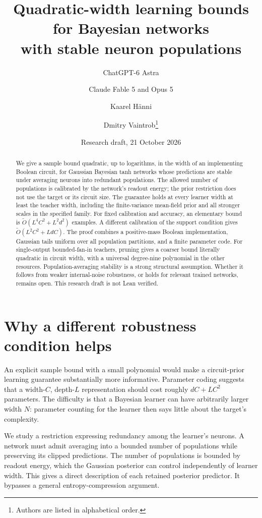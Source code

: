 \documentclass[11pt]{article}
\title{Quadratic-width learning bounds for Bayesian networks\protect\\with stable neuron populations}
\author{ChatGPT-6 Astra \and Claude Fable 5 and Opus 5 \and Kaarel H\"anni \and Dmitry Vaintrob\thanks{Authors are listed in alphabetical order.}}
\date{Research draft, 21 October 2026}
\begin{document}
\maketitle
\begin{abstract}
We give a sample bound quadratic, up to logarithms, in the width of an
implementing Boolean circuit, for Gaussian Bayesian tanh networks whose
predictions are stable under averaging neurons into redundant populations.
The allowed number of populations is calibrated by the network's readout
energy; the prior restriction does not use the target or its circuit size.
The guarantee holds at every learner width at least the teacher width,
including the finite-variance mean-field prior and all stronger scales in
the specified family. For fixed calibration and accuracy, an elementary
bound is $\widetilde O(L^4C^2+L^2d^2)$ examples. A different calibration of
the support condition gives $\widetilde O(L^2C^2+LdC)$.
The proof combines a positive-mass Boolean implementation, Gaussian tails
uniform over all population partitions, and a finite parameter code.
For single-output bounded-fan-in teachers, pruning gives a coarser bound
literally quadratic in circuit width, with a universal degree-nine
polynomial in the other resources.
Population-averaging stability is a strong structural assumption. Whether
it follows from weaker internal-noise robustness, or holds for relevant
trained networks, remains open. This research draft is not Lean verified.
\end{abstract}

\section{Why a different robustness condition helps}

An explicit sample bound with a small polynomial would make a circuit-prior
learning guarantee substantially more informative. Parameter coding suggests
that a width-$C$, depth-$L$ representation should cost roughly
$dC+LC^2$ parameters. The difficulty is that a Bayesian learner can have
arbitrarily larger width $N$: parameter counting for the learner then says
little about the target's complexity.

We study a restriction expressing redundancy among the learner's neurons.
A network must admit averaging into a bounded number of populations while
preserving its clipped predictions. The number of populations is bounded
by readout energy, which the Gaussian posterior can control independently
of learner width. This gives a direct description of each retained posterior
predictor. It bypasses a general entropy-compression argument.
\end{document}
